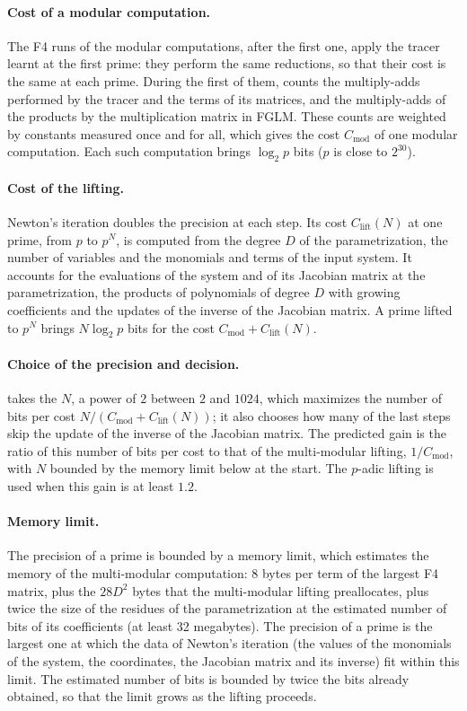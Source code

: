 \documentclass[a4paper,english,11pt]{scrartcl}
\theoremstyle{definition}
\theoremstyle{remark}
\begin{document}
\paragraph{Cost of a modular computation.} The F4 runs of the modular
computations, after the first one, apply the tracer learnt at the first prime:
they perform the same reductions, so that their cost is the same at each
prime. During the first of them, \msolve counts the multiply-adds performed
by the tracer and the terms of its matrices, and the multiply-adds of the
products by the multiplication matrix in FGLM. These counts are weighted by constants measured once and
for all, which gives the cost $C_{\mathrm{mod}}$ of one modular
computation. Each such computation brings $\log_2 p$ bits ($p$ is close to
$2^{30}$).

\paragraph{Cost of the lifting.} Newton's iteration doubles the precision at
each step. Its cost $C_{\mathrm{lift}}(N)$ at one prime, from $p$ to $p^N$,
is computed from the degree $D$ of the parametrization, the number of
variables and the monomials and terms of the input system. It accounts for
the evaluations of the system and of its Jacobian matrix at the
parametrization, the products of polynomials of degree $D$ with growing
coefficients and the updates of the inverse of the Jacobian matrix. A
prime lifted to $p^N$ brings $N \log_2 p$ bits for the cost
$C_{\mathrm{mod}} + C_{\mathrm{lift}}(N)$.

\paragraph{Choice of the precision and decision.} \msolve takes the $N$, a
power of $2$ between $2$ and $1024$, which maximizes the number of bits per
cost $N / (C_{\mathrm{mod}} + C_{\mathrm{lift}}(N))$; it also chooses how
many of the last steps skip the update of the inverse of the Jacobian
matrix. The predicted gain is the ratio of this number of bits per cost to
that of the multi-modular lifting, $1 / C_{\mathrm{mod}}$, with $N$ bounded
by the memory limit below at the start. The $p$-adic lifting is used when
this gain is at least $1.2$.

\paragraph{Memory limit.} The precision of a prime is bounded by a memory
limit, which estimates the memory of the multi-modular computation: 8
bytes per term of the largest F4 matrix, plus the $28 D^2$ bytes that the
multi-modular lifting preallocates, plus twice the size of the residues of
the parametrization at the estimated number of bits of its coefficients
(at least 32 megabytes). The precision of a prime is the largest one at
which the data of Newton's iteration (the values of the monomials of the
system, the coordinates, the Jacobian matrix and its inverse) fit within
this limit. The estimated number of bits is bounded by twice the bits
already obtained, so that the limit grows as the lifting proceeds.
\end{document}
